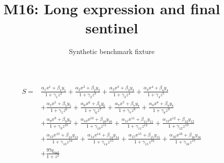 \documentclass{article}
\title{M16: Long expression and final sentinel}
\author{Synthetic benchmark fixture}
\date{}
\begin{document}
\maketitle
\[\begin{aligned}S={}&\frac{\alpha_{1}x^{1}+\beta_{1}y_{1}}{1+\gamma_{1}z^{2}}+\frac{\alpha_{2}x^{2}+\beta_{2}y_{2}}{1+\gamma_{2}z^{3}}+\frac{\alpha_{3}x^{3}+\beta_{3}y_{3}}{1+\gamma_{3}z^{4}}+\frac{\alpha_{4}x^{4}+\beta_{4}y_{4}}{1+\gamma_{4}z^{5}}\\&+\frac{\alpha_{5}x^{5}+\beta_{5}y_{5}}{1+\gamma_{5}z^{6}}+\frac{\alpha_{6}x^{6}+\beta_{6}y_{6}}{1+\gamma_{6}z^{7}}+\frac{\alpha_{7}x^{7}+\beta_{7}y_{7}}{1+\gamma_{7}z^{8}}+\frac{\alpha_{8}x^{8}+\beta_{8}y_{8}}{1+\gamma_{8}z^{9}}\\&+\frac{\alpha_{9}x^{9}+\beta_{9}y_{9}}{1+\gamma_{9}z^{10}}+\frac{\alpha_{10}x^{10}+\beta_{10}y_{10}}{1+\gamma_{10}z^{11}}+\frac{\alpha_{11}x^{11}+\beta_{11}y_{11}}{1+\gamma_{11}z^{12}}+\frac{\alpha_{12}x^{12}+\beta_{12}y_{12}}{1+\gamma_{12}z^{13}}\\&+\frac{\alpha_{13}x^{13}+\beta_{13}y_{13}}{1+\gamma_{13}z^{14}}+\frac{\alpha_{14}x^{14}+\beta_{14}y_{14}}{1+\gamma_{14}z^{15}}+\frac{\alpha_{15}x^{15}+\beta_{15}y_{15}}{1+\gamma_{15}z^{16}}+\frac{\alpha_{16}x^{16}+\beta_{16}y_{16}}{1+\gamma_{16}z^{17}}\\&+\frac{97q_{\mathrm{end}}}{1+z^2}\end{aligned}\]
\end{document}
